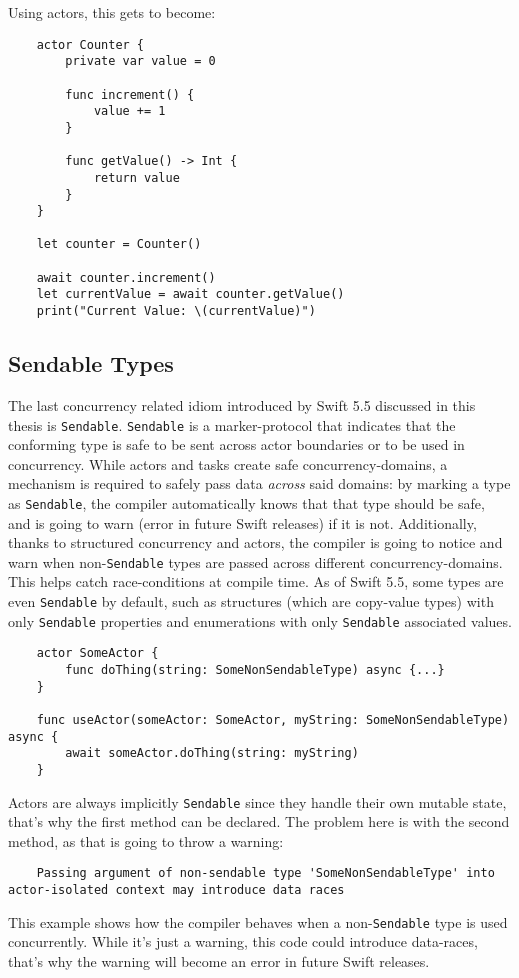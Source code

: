 Using actors, this gets to become:
\begin{verbatim}
    actor Counter {
        private var value = 0
    
        func increment() {
            value += 1
        }
    
        func getValue() -> Int {
            return value
        }
    }

    let counter = Counter()

    await counter.increment()
    let currentValue = await counter.getValue()
    print("Current Value: \(currentValue)")
\end{verbatim}

\subsection{Sendable Types}
The last concurrency related idiom introduced by Swift 5.5 discussed in this thesis is \lstinline{Sendable}.
\lstinline{Sendable} is a \gls{marker-protocol} that indicates that the conforming type is safe to be sent across actor boundaries or to be used in concurrency. 
While actors and tasks create safe \gls{concurrency-domain}s, a mechanism is required to safely pass data \textit{across} said domains: by marking a type as \lstinline{Sendable}, the compiler automatically knows that that type should be safe, and is going to warn (error in future Swift releases) if it is not. Additionally, thanks to structured concurrency and actors, the compiler is going to notice and warn when non-\lstinline{Sendable} types are passed across different concurrency-domains. This helps catch \gls{race-condition}s at compile time. As of Swift 5.5, some types are even \lstinline{Sendable} by default, such as structures (which are copy-value types) with only \lstinline{Sendable} properties and enumerations with only \lstinline{Sendable} associated values. \cite{swift-book}
\begin{verbatim}
    actor SomeActor {
        func doThing(string: SomeNonSendableType) async {...}
    }
    
    func useActor(someActor: SomeActor, myString: SomeNonSendableType) async {
        await someActor.doThing(string: myString)
    }
\end{verbatim}
Actors are always implicitly \lstinline{Sendable} since they handle their own mutable state, that's why the first method can be declared. The problem here is with the second method, as that is going to throw a warning:
\begin{lstlisting}
    Passing argument of non-sendable type 'SomeNonSendableType' into actor-isolated context may introduce data races
\end{lstlisting}
This example shows how the compiler behaves when a non-\lstinline{Sendable} type is used concurrently. While it's just a warning, this code could introduce \gls{data-race}s, that's why the warning will become an error in future Swift releases. \cite{sendable-proposal}

